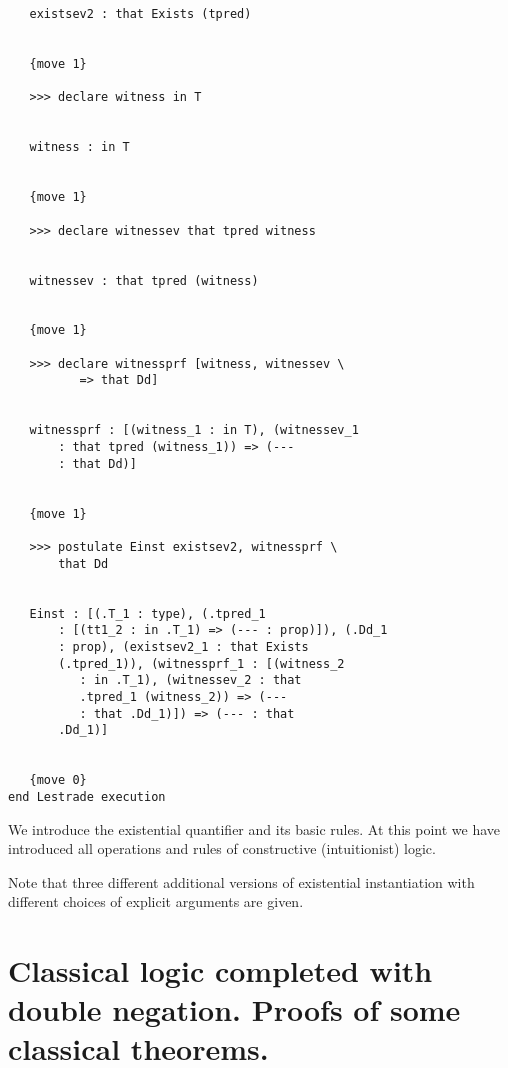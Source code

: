 \documentclass[12pt]{article}
\begin{document}
\begin{verbatim}
   existsev2 : that Exists (tpred)


   {move 1}

   >>> declare witness in T


   witness : in T


   {move 1}

   >>> declare witnessev that tpred witness


   witnessev : that tpred (witness)


   {move 1}

   >>> declare witnessprf [witness, witnessev \
          => that Dd]


   witnessprf : [(witness_1 : in T), (witnessev_1 
       : that tpred (witness_1)) => (--- 
       : that Dd)]


   {move 1}

   >>> postulate Einst existsev2, witnessprf \
       that Dd


   Einst : [(.T_1 : type), (.tpred_1 
       : [(tt1_2 : in .T_1) => (--- : prop)]), (.Dd_1 
       : prop), (existsev2_1 : that Exists 
       (.tpred_1)), (witnessprf_1 : [(witness_2 
          : in .T_1), (witnessev_2 : that 
          .tpred_1 (witness_2)) => (--- 
          : that .Dd_1)]) => (--- : that 
       .Dd_1)]


   {move 0}
end Lestrade execution
\end{verbatim}

We introduce the existential quantifier and its basic rules.  At this point we have introduced all operations and rules of constructive (intuitionist) logic.

Note that three different additional versions of existential instantiation with different choices of explicit arguments are given.

\section{Classical logic completed with double negation.  Proofs of some classical theorems.}
\end{document}
